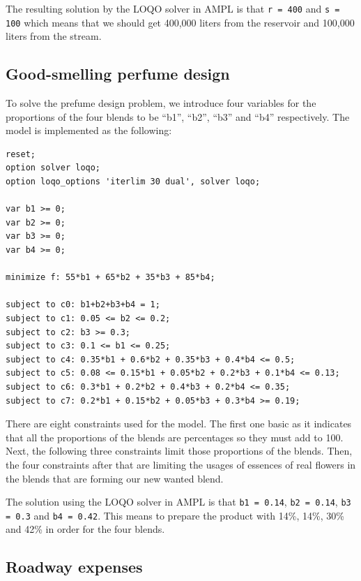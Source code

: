 The resulting solution by the LOQO solver in AMPL is that \texttt{r = 400} and \texttt{s = 100} which means that we should get 400,000 liters from the reservoir and 100,000 liters from the stream.

\subsection{Good-smelling perfume design}
To solve the prefume design problem, we introduce four variables for the proportions of the four blends to be ``b1'', ``b2'', ``b3'' and ``b4'' respectively. The model is implemented as the following:
\begin{verbatim}
reset;
option solver loqo;
option loqo_options 'iterlim 30 dual', solver loqo;

var b1 >= 0;
var b2 >= 0;
var b3 >= 0;
var b4 >= 0;

minimize f: 55*b1 + 65*b2 + 35*b3 + 85*b4;

subject to c0: b1+b2+b3+b4 = 1;
subject to c1: 0.05 <= b2 <= 0.2;
subject to c2: b3 >= 0.3;
subject to c3: 0.1 <= b1 <= 0.25;
subject to c4: 0.35*b1 + 0.6*b2 + 0.35*b3 + 0.4*b4 <= 0.5;
subject to c5: 0.08 <= 0.15*b1 + 0.05*b2 + 0.2*b3 + 0.1*b4 <= 0.13;
subject to c6: 0.3*b1 + 0.2*b2 + 0.4*b3 + 0.2*b4 <= 0.35;
subject to c7: 0.2*b1 + 0.15*b2 + 0.05*b3 + 0.3*b4 >= 0.19;
\end{verbatim}
There are eight constraints used for the model. The first one basic as it indicates that all the proportions of the blends are percentages so they must add to 100. Next, the following three constraints limit those proportions of the blends. Then, the four constraints after that are limiting the usages of essences of real flowers in the blends that are forming our new wanted blend.

The solution using the LOQO solver in AMPL is that \texttt{b1 = 0.14}, \texttt{b2 = 0.14}, \texttt{b3 = 0.3} and \texttt{b4 = 0.42}. This means to prepare the product with 14\%, 14\%, 30\% and 42\% in order for the four blends.

\subsection{Roadway expenses}
